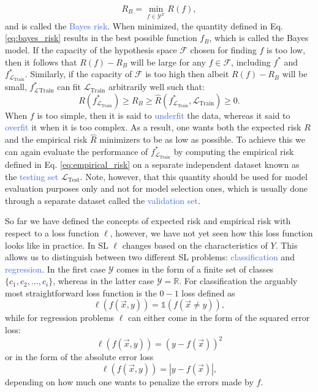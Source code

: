 \begin{equation}
	R_B = \underset{f\in\mathcal{Y}^{\mathcal{X}}}{\min} R(f),
	\label{eq:bayes_risk}
\end{equation}
and is called the \textcolor{RoyalBlue}{Bayes risk}. When minimized, the quantity defined in Eq. \ref{eq:bayes_risk} results in the best possible function $f_B$, which is called the Bayes model. If the capacity of the hypothesis space $\mathcal{F}$ chosen for finding $f$ is too low, then it follows that $R(f)-R_B$ will be large for any $f\in\mathcal{F}$, including $f^{*}$ and $f^{*}_{\mathcal{L}_{\text{Train}}}$. Similarly, if the capacity of $\mathcal{F}$ is too high then albeit $R(f)-R_B$ will be small, $f^{*}_\mathcal{L}_{\text{Train}}$ can fit 
$\mathcal{L}_{\text{Train}}$ arbitrarily well such that:
\begin{equation}
	R(f^{*}_{\mathcal{L}_{\text{Train}}}) \geq R_B \geq \hat{R}(f^{*}_{\mathcal{L}_{\text{Train}}},\mathcal{L}_{\text{Train}}) \geq 0.
\end{equation}
When $f$ is too simple, then it is said to \textcolor{RoyalBlue}{underfit} the data, whereas it said to \textcolor{RoyalBlue}{overfit} it when it is too complex. As a result, one wants both the expected risk $R$ and the empirical risk $\hat{R}$ minimizers to be as low as possible. To achieve this we can again evaluate the performance of $f^{*}_{\mathcal{L}_{\text{Train}}}$ by computing the empirical risk defined in Eq. \ref{eq:empirical_risk} on a separate independent dataset known as the \textcolor{RoyalBlue}{testing set} $\mathcal{L}_{\text{Test}}$. Note, however, that this quantity should be used for model evaluation purposes only and not for model selection ones, which is usually done through a separate dataset called the \textcolor{RoyalBlue}{validation set}. 

So far we have defined the concepts of expected risk and empirical risk with respect to a loss function $\ell$, however, we have not yet seen how this loss function looks like in practice. In SL $\ell$ changes based on the characteristics of $Y$. This allows us to distinguish between two different SL problems: \textcolor{RoyalBlue}{classification} and \textcolor{RoyalBlue}{regression}. In the first case $\mathcal{Y}$ comes in the form of a finite set of classes $\{c_1, c_2,...,c_i\}$, whereas in the latter case $\mathcal{Y}=\mathds{R}$. For classification the arguably most straightforward loss function is the $0-1$ loss defined as 
\begin{equation}
	\ell(f(\vec{x},y)) = \mathbb{1}(f(\vec{x}\neq y)),
\end{equation}
while for regression problems $\ell$ can either come in the form of the squared error loss:
\begin{equation}
	\ell(f(\vec{x},y))=(y-f(\vec{x}))^2
\end{equation}
or in the form of the absolute error loss
\begin{equation}
	\ell(f(\vec{x},y))=|y-f(\vec{x})|,
\end{equation}
depending on how much one wants to penalize the errors made by $f$.

